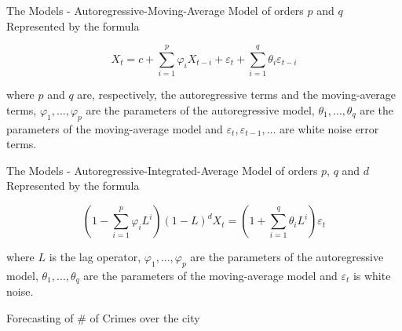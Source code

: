 \documentclass[12pt]{beamer}
\begin{document}
        \begin{frame}{The Models - Autoregressive-Moving-Average Model of orders $p$ and $q$}
            Represented by the formula

            \begin{equation*}
                X_t = c + \sum_{i = 1}^{p}\varphi_iX_{t - i} + \varepsilon_t + \sum_{i = 1}^{q}\theta_i
                \varepsilon_{t - i}
            \end{equation*}

            where $p$ and $q$ are, respectively, the autoregressive terms and the moving-average terms,
            $\varphi_{1}, \ldots , \varphi_{p}$ are the parameters of the autoregressive model,
            $\theta_1, \ldots, \theta_q$ are the parameters of the moving-average model and
            $\varepsilon_t, \varepsilon_{t - 1}, \ldots$ are white noise error terms.
        \end{frame}

        \begin{frame}{The Models - Autoregressive-Integrated-Average Model of orders $p$, $q$ and $d$}
            Represented by the formula

            \begin{equation*}
                \left ( 1 - \sum_{i=1}^p\varphi_iL^i\right )(1 - L)^dX_t =
                \left ( 1 + \sum_{i = 1}^{q}\theta_iL^i \right ) \varepsilon_t
            \end{equation*}

            where $L$ is the lag operator, $\varphi_{1}, \ldots , \varphi_{p}$ are the parameters of the
            autoregressive model, $\theta_1, \ldots, \theta_q$ are the parameters of the moving-average
            model and $\varepsilon _{t}$ is white noise.
        \end{frame}

        \begin{frame}{Forecasting of \# of Crimes over the city}
            \begin{figure}
                \centering
            \end{figure}
        \end{frame}
\end{document}
